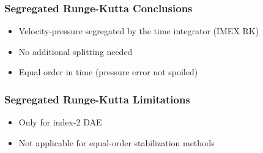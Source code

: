 \begin{frame}
\frametitle{Segregated Runge-Kutta Conclusions}
\vfill
\begin{itemize}
\item<1-> Velocity-pressure segregated by the time integrator (IMEX RK)
\item<2-> No additional splitting needed
\item<3-> Equal order in time (pressure error not spoiled)
\end{itemize}
\vfill
\end{frame}
\begin{frame}
\frametitle{Segregated Runge-Kutta Limitations}
\vfill
\begin{itemize}
\item<1-> Only for index-2 DAE
\item<2-> Not applicable for equal-order stabilization methods
\end{itemize}
\vfill
\end{frame}